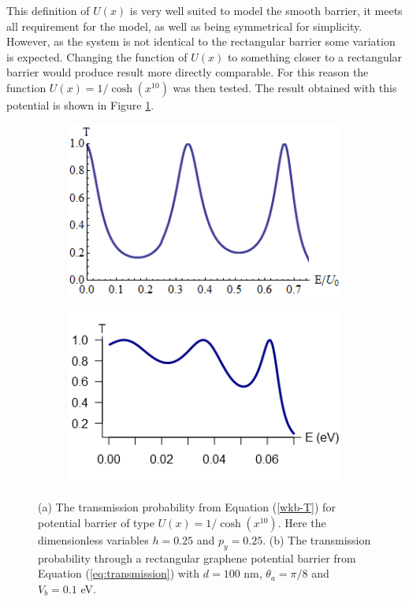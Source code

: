 		This definition of $U(x)$ is very well suited to model the smooth barrier, it meets all requirement for the model, as well as being symmetrical for simplicity. However, as the system is not identical to the rectangular barrier some variation is expected. Changing the function of $U\left(x\right)$ to something closer to a rectangular barrier would produce result more directly comparable. For this reason the function $U\left(x\right)=1/\cosh\left(x^{10}\right)$ was then tested. The result obtained with this potential is shown in Figure \ref{graphene-wkb-results-coshx10}.
		\begin{figure}[h]
			 \begin{subfigure}[h!]{0.5\textwidth}
				\centerline{\includegraphics[scale=0.6]{images/graphene-wkb-results-coshx10}}
				\caption{}
			\end{subfigure}
			\begin{subfigure}[h!]{0.5\textwidth}
				\centerline{\includegraphics[scale=0.9]{images/wkb-comparison}}
				\caption{}
			\end{subfigure}
			\caption{(a) The transmission probability from Equation (\ref{wkb-T}) for potential barrier of type $U\left(x\right)=1/\cosh(x^{10})$. Here the dimensionless variables $h=0.25$ and $p_{y}=0.25$. (b) The transmission probability through a rectangular graphene potential barrier from Equation (\ref{eq:transmission}) with $d=100$ nm, $\theta_{a}=\pi /8$ and $V_{b}=0.1$ eV.}
			\label{graphene-wkb-results-coshx10}
		\end{figure}

